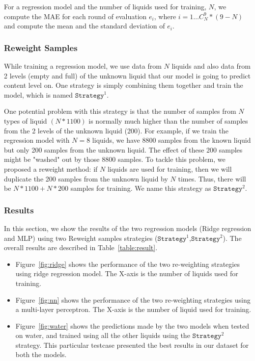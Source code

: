 \documentclass{article} %
\begin{document}
For a regression model and the number of liquids used for training, $N$, we compute the MAE for each round of evaluation $e_i$, where $i= 1\dots C_N^9 * (9-N)$ and compute the mean and the standard deviation of $e_i$.

\subsubsection{Reweight Samples}
While training a regression model, we use data from $N$ liquids and also data from 2 levels (empty and full) of the unknown liquid that our model is going to predict content level on. One strategy is simply combining them together and train the model, which is named $\mathtt{Strategy}^1$. 

One potential problem with this strategy is that the number of samples from $N$ types of liquid $(N * 1100)$ is normally much higher than the number of samples from the 2 levels of the unknown liquid (200). For example, if we train the regression model with $N = 8$ liquids, we have 8800 samples from the known liquid but only 200 samples from the unknown liquid. The effect of these 200 samples might be "washed" out by those 8800 samples. To tackle this problem, we proposed a reweight method: if $N$ liquids are used for training, then we will duplicate the 200 samples from the unknown liquid by $N$ times. Thus, there will be $N * 1100 + N * 200$ samples for training. We name this strategy as $\mathtt{Strategy}^2$.

\subsubsection{Results}
In this section, we show the results of the two regression models (Ridge regression and MLP) using two Reweight samples strategies ($\mathtt{Strategy}^1$,$\mathtt{Strategy}^2$). The overall results are described in Table~\ref{table:result}.

\begin{itemize}
\item Figure~\ref{fig:ridge} shows the performance of the two re-weighting strategies using ridge regression model. The X-axis is the number of liquids used for training.

\item Figure~\ref{fig:nn} shows the performance of the two re-weighting strategies using a multi-layer perceptron. The X-axis is the number of liquid used for training.

\item Figure~\ref{fig:water} shows the predictions made by the two models when tested on water, and trained using all the other liquids using the $\mathtt{Strategy}^2$ strategy. This particular testcase presented the best results in our dataset for both the models.
\end{itemize}
\end{document}
